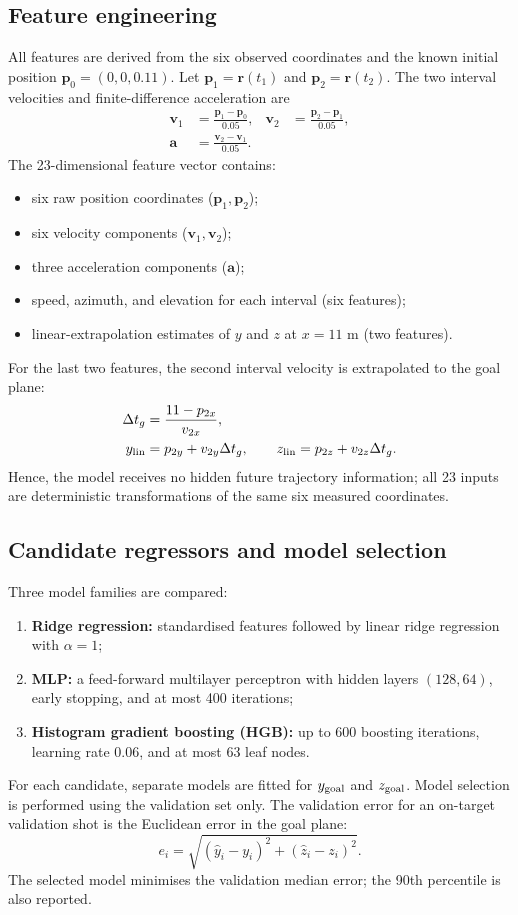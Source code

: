 \documentclass[11pt,a4paper]{article}
\begin{document}
\subsection{Feature engineering}
All features are derived from the six observed coordinates and the known initial position $\bm p_0=(0,0,0.11)$. Let $\bm p_1=\bm r(t_1)$ and $\bm p_2=\bm r(t_2)$. The two interval velocities and finite-difference acceleration are
\begin{align}
    \bm v_1&=\frac{\bm p_1-\bm p_0}{0.05},&
    \bm v_2&=\frac{\bm p_2-\bm p_1}{0.05},\\
    \bm a&=\frac{\bm v_2-\bm v_1}{0.05}.
\end{align}
The 23-dimensional feature vector contains:
\begin{itemize}[leftmargin=*]
    \item six raw position coordinates ($\bm p_1,\bm p_2$);
    \item six velocity components ($\bm v_1,\bm v_2$);
    \item three acceleration components ($\bm a$);
    \item speed, azimuth, and elevation for each interval (six features);
    \item linear-extrapolation estimates of $y$ and $z$ at $x=11$ m (two features).
\end{itemize}
For the last two features, the second interval velocity is extrapolated to the goal plane:
\begin{align}
    \Delta t_g&=\frac{11-p_{2x}}{v_{2x}},\\
    y_{\rm lin}&=p_{2y}+v_{2y}\Delta t_g,\qquad
    z_{\rm lin}=p_{2z}+v_{2z}\Delta t_g.
\end{align}
Hence, the model receives no hidden future trajectory information; all 23 inputs are deterministic transformations of the same six measured coordinates.

\subsection{Candidate regressors and model selection}
Three model families are compared:
\begin{enumerate}[leftmargin=*]
    \item \textbf{Ridge regression:} standardised features followed by linear ridge regression with $\alpha=1$;
    \item \textbf{MLP:} a feed-forward multilayer perceptron with hidden layers $(128,64)$, early stopping, and at most 400 iterations;
    \item \textbf{Histogram gradient boosting (HGB):} up to 600 boosting iterations, learning rate $0.06$, and at most 63 leaf nodes.
\end{enumerate}
For each candidate, separate models are fitted for $y_{\rm goal}$ and $z_{\rm goal}$. Model selection is performed using the validation set only. The validation error for an on-target validation shot is the Euclidean error in the goal plane:
\begin{equation}
    e_i=\sqrt{(\widehat y_i-y_i)^2+(\widehat z_i-z_i)^2}.
\end{equation}
The selected model minimises the validation median error; the 90th percentile is also reported.
\end{document}
